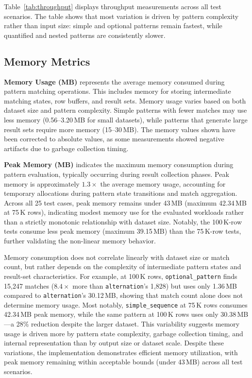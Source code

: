 Table~\ref{tab:throughput} displays throughput measurements across
all test scenarios.  The table shows that most variation is driven by
pattern complexity rather than input size: simple and optional
patterns remain fastest, while quantified and nested patterns are
consistently slower.

\subsection{Memory Metrics}
\label{subsec:eval-memory}

\noindent\textbf{Memory Usage (MB)} represents the average memory
consumed during pattern matching operations.  This includes memory
for storing intermediate matching states, row buffers, and result
sets.  Memory usage varies based on both dataset size and pattern
complexity.  Simple patterns with fewer matches may use less memory
(0.56--3.20\,MB for small datasets), while patterns that generate
large result sets require more memory (15--30\,MB).  The memory
values shown have been corrected to absolute values, as some
measurements showed negative artifacts due to garbage collection
timing.

\noindent\textbf{Peak Memory (MB)} indicates the maximum memory
consumption during pattern evaluation, typically occurring during
result collection phases.  Peak memory is approximately $1.3\times$
the average memory usage, accounting for temporary allocations during
pattern state transitions and match aggregation.  Across all 25 test
cases, peak memory remains under 43\,MB (maximum 42.34\,MB at 75\,K
rows), indicating modest memory use for the evaluated workloads rather
than a strictly monotonic relationship with dataset size.  Notably,
the 100\,K-row tests consume less peak memory
(maximum 39.15\,MB) than the 75\,K-row tests, further validating the
non-linear memory behavior.

Memory consumption does not correlate linearly with dataset size or
match count, but rather depends on the complexity of intermediate
pattern states and result-set characteristics.  For example, at
100\,K rows, \texttt{optional\_pattern} finds 15{,}247 matches
($8.4\times$ more than \texttt{alternation}'s 1{,}828) but uses only
1.36\,MB compared to \texttt{alternation}'s 30.12\,MB, showing
that match count alone does not determine memory usage.  Most
notably, \texttt{simple\_sequence} at 75\,K rows consumes
42.34\,MB peak memory, while the same pattern at 100\,K rows uses
only 30.38\,MB---a 28\% reduction despite the larger dataset.  This
variability suggests memory usage is driven more by pattern state
complexity, garbage collection timing, and internal representation
than by output size or dataset scale.  Despite these variations, the
implementation demonstrates efficient memory utilization, with peak
memory remaining within acceptable bounds (under 43\,MB) across all
test scenarios.

